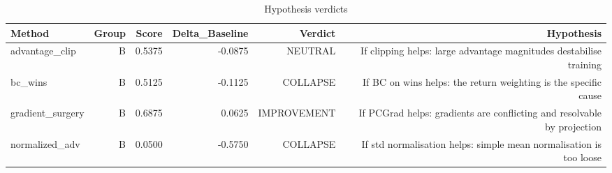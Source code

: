 \begin{table}[htbp]
\centering
\caption{Hypothesis verdicts}
\label{tab:hyp-verdicts}
\begin{tabular}{lrrrrr}
\toprule
\textbf{Method} & \textbf{Group} & \textbf{Score} & \textbf{Delta\_Baseline} & \textbf{Verdict} & \textbf{Hypothesis} \\
\midrule
advantage\_clip & B & 0.5375 & -0.0875 & NEUTRAL & If clipping helps: large advantage magnitudes destabilise training \\
bc\_wins & B & 0.5125 & -0.1125 & COLLAPSE & If BC on wins helps: the return weighting is the specific cause \\
gradient\_surgery & B & 0.6875 & 0.0625 & IMPROVEMENT & If PCGrad helps: gradients are conflicting and resolvable by projection \\
normalized\_adv & B & 0.0500 & -0.5750 & COLLAPSE & If std normalisation helps: simple mean normalisation is too loose \\
\bottomrule
\end{tabular}
\end{table}